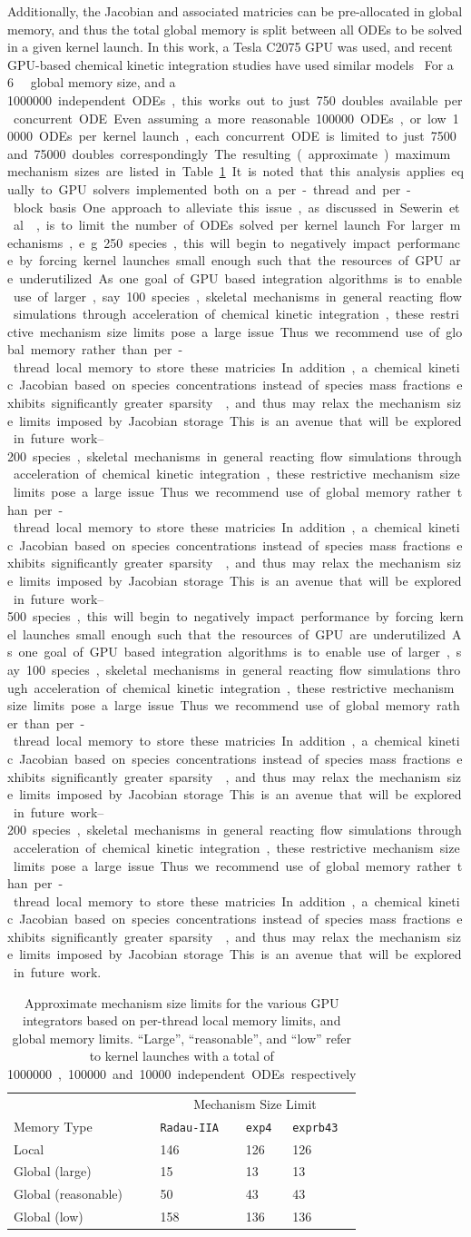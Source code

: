 \documentclass[preprint]{elsarticle}
\begin{document}
Additionally, the Jacobian and associated matricies can be pre-allocated in global memory, and thus the total global memory is split between all ODEs to be solved in a given kernel launch.
In this work, a Tesla C2075 GPU was used, and recent GPU-based chemical kinetic integration studies have used similar models~\cite{Shi:2011aa,Niemeyer:2011aa,Shi:2012aa,Le2013596,Stone:2013aa,Niemeyer:2014aa}
For a \SI{6}{\giga\byte} global memory size, and a \SI{1000000} independent ODEs, this works out to just \SI{750} doubles available per concurrent ODE.
Even assuming a more reasonable \SI{100000} ODEs, or low \SI{10000} ODEs per kernel launch, each concurrent ODE is limited to just \SI{7500} and \SI{75000} doubles correspondingly.
The resulting (approximate) maximum mechanism sizes are listed in Table~\ref{T:size_limits}.
It is noted that this analysis applies equally to GPU solvers implemented both on a per-thread and per-block basis.
One approach to alleviate this issue, as discussed in Sewerin et al.~\cite{Sewerin20151375}, is to limit the number of ODEs solved per kernel launch.
For larger mechanisms, e.g. \SIrange{250}{500} species, this will begin to negatively impact performance by forcing kernel launches small enough such that the resources of GPU are underutilized.

As one goal of GPU based integration algorithms is to enable use of larger, say \SIrange{100}{200} species, skeletal mechanisms in general reacting flow simulations through acceleration of chemical kinetic integration, these restrictive mechanism size limits pose a large issue.
Thus we recommend use of global memory rather than per-thread local memory to store these matricies.
In addition, a chemical kinetic Jacobian based on species concentrations instead of species mass fractions exhibits significantly greater sparsity~\cite{Lu:2009gh}, and thus may relax the mechanism size limits imposed by Jacobian storage.
This is an avenue that will be explored in future work.

\begin{table}[h]
\centering
\begin{tabular}{@{}l l l l@{}}
 \toprule
& \multicolumn{3}{c}{Mechanism Size Limit} \\
Memory Type & \texttt{Radau-IIA} & \texttt{exp4} & \texttt{exprb43} \\
\midrule
Local	    & 146 & 126 & 126 \\

Global (large)	    & 15 & 13 & 13 \\
Global (reasonable) & 50 & 43 & 43 \\
Global (low) & 158 & 136 & 136 \\
\bottomrule
\end{tabular}
\caption{
Approximate mechanism size limits for the various GPU integrators based on per-thread local memory limits, and global memory limits.
``Large'', ``reasonable'', and ``low'' refer to kernel launches with a total of \SI{1000000}, \SI{100000} and \SI{10000} independent ODEs respectively
}
\label{T:size_limits}
\end{table}
\end{document}
